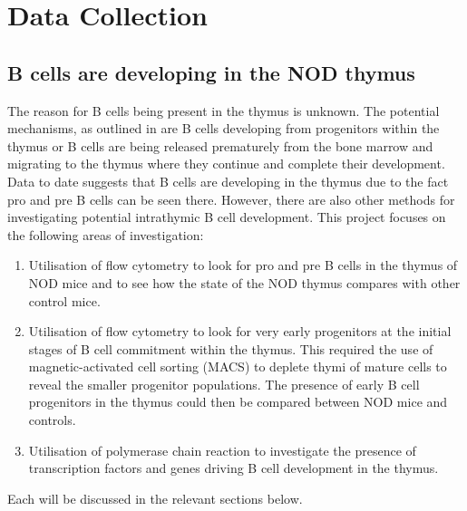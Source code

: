 
\chapter{Data Collection}




\section{B cells are developing in the NOD thymus}

The reason for B cells being present in the thymus is unknown. 
The potential mechanisms, as outlined in  are B cells developing from progenitors within the thymus or B cells are being released prematurely from the bone marrow and migrating to the thymus where they continue and complete their development.
Data to date suggests that B cells are developing in the thymus due to the fact pro and pre B cells can be seen there. 
However, there are also other methods for investigating potential intrathymic B cell development.
This project focuses on the following areas of investigation:

\begin{enumerate}
\item Utilisation of flow cytometry to look for pro and pre B cells in the thymus of NOD mice and to see how the state of the NOD thymus compares with other control mice.

\item Utilisation of flow cytometry to look for very early progenitors at the initial stages of B cell commitment within the thymus. 
This required the use of magnetic-activated cell sorting (MACS) to deplete thymi of mature cells to reveal the smaller progenitor populations. 
The presence of early B cell progenitors in the thymus could then be compared between NOD mice and controls. 

\item Utilisation of polymerase chain reaction to investigate the presence of transcription factors and genes driving B cell development in the  thymus. 
\end{enumerate}

Each will be discussed in the relevant sections below.

